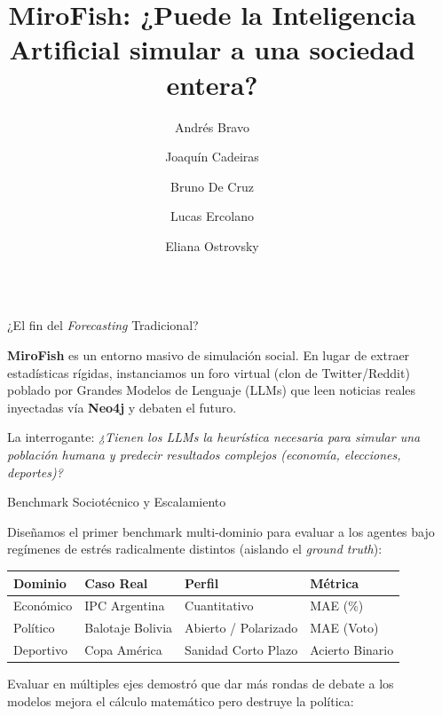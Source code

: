 \documentclass[final]{beamer}
\title{MiroFish: ¿Puede la Inteligencia Artificial simular a una sociedad entera?}
\author{Andrés Bravo \and Joaquín Cadeiras\and Bruno De Cruz\and Lucas Ercolano \and Eliana Ostrovsky }
\institute[shortinst]{Universidad de San Andrés --- Procesamiento del Lenguaje Natural}
\newlength{\sepwidth}
\newlength{\colwidth}
\newcommand{\separatorcolumn}{\begin{column}{\sepwidth}\end{column}}
\begin{document}
\begin{frame}[t]
\begin{columns}[t]
\separatorcolumn

\begin{column}{\colwidth}

  \begin{block}{¿El fin del \textit{Forecasting} Tradicional?}

    \textbf{MiroFish} es un entorno masivo de simulación social. En lugar de extraer estadísticas rígidas, instanciamos un foro virtual (clon de Twitter/Reddit) poblado por Grandes Modelos de Lenguaje (LLMs) que leen noticias reales inyectadas vía \textbf{Neo4j} y debaten el futuro.
    
    \vspace{0.5cm}
    La interrogante: \textit{¿Tienen los LLMs la heurística necesaria para simular una población humana y predecir resultados complejos (economía, elecciones, deportes)?}

  \end{block}

  \begin{block}{Benchmark Sociotécnico y Escalamiento}

    Diseñamos el primer benchmark multi-dominio para evaluar a los agentes bajo regímenes de estrés radicalmente distintos (aislando el \textit{ground truth}):

    \begin{table}
      \centering
      \small
      \begin{tabular}{l l l l}
        \toprule
        \textbf{Dominio} & \textbf{Caso Real} & \textbf{Perfil} & \textbf{Métrica} \\
        \midrule
        Económico & IPC Argentina & Cuantitativo & MAE (\%) \\
        Político & Balotaje Bolivia & Abierto / Polarizado & MAE (Voto) \\
        Deportivo & Copa América & Sanidad Corto Plazo & Acierto Binario \\
        \bottomrule
      \end{tabular}
    \end{table}
    
    \vspace{0.3cm}
    Evaluar en múltiples ejes demostró que dar más rondas de debate a los modelos mejora el cálculo matemático pero destruye la política:
    

\end{block}
\end{column}
\end{columns}
\end{frame}
\end{document}

